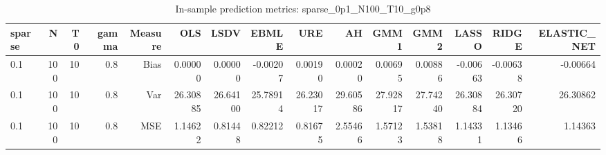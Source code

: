 \begin{table}[!htbp]\centering
\caption{In-sample prediction metrics: sparse_0p1_N100_T10_g0p8}
\label{tab:table2_sparse_0p1_N100_T10_g0p8}
\begin{tabular}{lrrrrrrrrrrrrrr}
\hline
sparse & N & T0 & gamma & Measure & OLS & LSDV & EBMLE & URE & AH & GMM1 & GMM2 & LASSO & RIDGE & ELASTIC_NET \\
\hline
0.1 & 100 & 10 & 0.8 & Bias & 0.00000 & 0.00000 & -0.00207 & 0.00190 & 0.00020 & 0.00695 & 0.00886 & -0.00663 & -0.00638 & -0.00664 \\
0.1 & 100 & 10 & 0.8 & Var & 26.30885 & 26.64100 & 25.78914 & 26.23017 & 29.60586 & 27.92817 & 27.74240 & 26.30884 & 26.30720 & 26.30862 \\
0.1 & 100 & 10 & 0.8 & MSE & 1.14622 & 0.81448 & 0.82212 & 0.81675 & 2.55466 & 1.57123 & 1.53818 & 1.14331 & 1.13466 & 1.14363 \\
\hline
\end{tabular}
\end{table}

